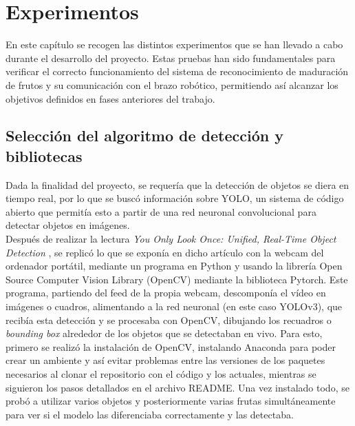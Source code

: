 \chapter{Experimentos}
\label{cap:capitulo6}

En este capítulo se recogen las distintos experimentos que se han llevado a cabo durante el desarrollo del proyecto. Estas pruebas han sido fundamentales para verificar el correcto funcionamiento del sistema de reconocimiento de maduración de frutos y su comunicación con el brazo robótico, permitiendo así alcanzar los objetivos definidos en fases anteriores del trabajo.

\section{Selección del algoritmo de detección y bibliotecas}
\label{exp_seleccion_algoritmo}

Dada la finalidad del proyecto, se requería que la detección de objetos se diera en tiempo real, por lo que se buscó información sobre YOLO, un sistema de código abierto que permitía esto a partir de una red neuronal convolucional para detectar objetos en imágenes.\\

Después de realizar la lectura \textit{You Only Look Once: Unified, Real-Time Object Detection} \cite{Redmon16}, se replicó lo que se exponía en dicho artículo con la webcam del ordenador portátil, mediante un programa en Python y usando la librería Open Source Computer Vision Library (OpenCV) mediante la biblioteca Pytorch. Este programa, partiendo del feed de la propia webcam, descomponía el vídeo en imágenes o cuadros, alimentando a la red neuronal (en este caso YOLOv3), que recibía esta detección y se procesaba con OpenCV, dibujando los recuadros o \textit{bounding box} alrededor de los objetos que se detectaban en vivo.
Para esto, primero se realizó la instalación de OpenCV, instalando Anaconda para poder crear un ambiente y así evitar problemas entre las versiones de los paquetes necesarios al clonar el repositorio con el código y los actuales, mientras se siguieron los pasos detallados en el archivo README.
Una vez instalado todo, se probó a utilizar varios objetos y posteriormente varias frutas simultáneamente para ver si el modelo las diferenciaba correctamente y las detectaba.

